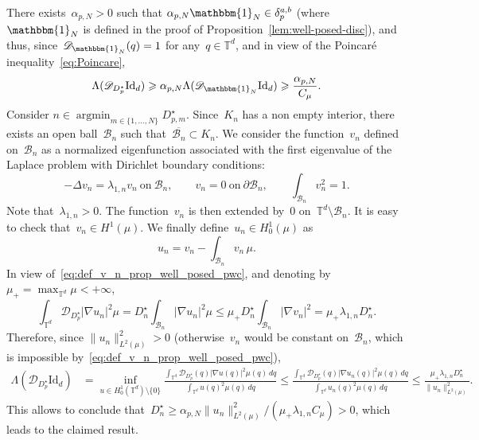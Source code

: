 \documentclass{article}
\newcommand{\dps}{\displaystyle }
\newcommand{\Id}{\mathrm{Id}}
\renewcommand{\leq}{\leqslant}
\renewcommand{\geq}{\geqslant}
\def\T{\mathbb{T}}
\newcommand{\Df}{\mathscr{D}}
\newcommand{\diff}{D}
\newcommand{\diffset}{\delta}
\renewcommand{\dim}{d}
\begin{document}
There exists~$\alpha_{p,N} > 0$ such that $\alpha_{p,N} \mathbbm{1}_N\in\diffset_p^{a,b}$ (where~$\mathbbm{1}_N$ is defined in the proof of Proposition~\ref{lem:well-posed-disc}), and thus, since~$\Df_{\mathbbm{1}_N}(q) = 1$ for any~$q \in \T^\dim$, and in view of the Poincar\'e inequality~\eqref{eq:Poincare},
\begin{equation}
  \label{eq:lower-lambda}
  \Lambda(\Df_{\diff^{\star}_p} \Id_\dim) \geq \alpha_{p,N}\Lambda(\Df_{\mathbbm{1}_N} \Id_\dim) \geq \frac{\alpha_{p,N}}{C_{\mu}}.
\end{equation}
Consider $n \in \operatorname{argmin}_{m \in \{1,\ldots,N\}} \diff^{\star}_{p,m}$.
Since~$K_n$ has a non empty interior, there exists an open ball~$\mathscr{B}_n$ such that~$\overline{\mathscr{B}_n} \subset K_n$. We consider the function~$v_n$ defined on~$\mathscr{B}_n$ as a normalized eigenfunction associated with the first eigenvalue of the Laplace problem with Dirichlet boundary conditions:
\begin{equation}
  \label{eq:def_v_n_prop_well_posed_pwc}
  -\Delta v_n = \lambda_{1,n} v_n \ \mathrm{on} \ \mathscr{B}_n, \qquad v_n = 0 \ \mathrm{on} \ \partial \mathscr{B}_n, \qquad \int_{\mathscr{B}_n} v_n^2 = 1. 
\end{equation}
Note that~$\lambda_{1,n} > 0$. The function~$v_n$ is then extended by~0 on~$\T^\dim \setminus \mathscr{B}_n$. It is easy to check that~$v_n \in H^1(\mu)$. We finally define~$u_n \in H^1_0(\mu)$ as
\[
u_n = v_n - \int_{\mathscr{B}_n} v_n \, \mu.
\]
In view of~\eqref{eq:def_v_n_prop_well_posed_pwc}, and denoting by~$\mu_+ = \max_{\T^\dim} \mu < +\infty$,
\[
\int_{\T^\dim} \Df_{\diff^{\star}_p} |\nabla u_n|^2 \mu = \diff^\star_n \int_{\mathscr{B}_n} |\nabla u_n|^2 \mu \leq \mu_+ \diff^\star_n \int_{\mathscr{B}_n} |\nabla v_n|^2 = \mu_+ \lambda_{1,n} \diff^\star_n.
\]
Therefore, since $\|u_n\|^2_{L^2(\mu)} > 0$ (otherwise~$v_n$ would be constant on~$\mathscr{B}_n$, which is impossible by~\eqref{eq:def_v_n_prop_well_posed_pwc}),
\begin{equation}
  \begin{aligned}
    \Lambda(\Df_{\diff^{\star}_p}\Id_\dim) &= \inf_{u\in H^1_0(\T^\dim) \setminus\{0\}}\frac{\dps \int_{\T^\dim}\Df_{\diff^{\star}_p}(q)|\nabla u(q)|^2\mu(q)\,dq}{\dps\int_{\T^\dim}u(q)^2\mu(q)\,dq} \leq \frac{\dps \int_{\T^\dim}\Df_{\diff^{\star}_p}(q)|\nabla u_n(q)|^2\mu(q)\,dq}{\dps\int_{\T^\dim}u_n(q)^2\mu(q)\,dq} \leq \frac{\mu_+\lambda_{1,n} \diff^\star_n }{\|u_n\|^2_{L^2(\mu)}} .
  \end{aligned}
\end{equation}
This allows to conclude that~$\diff^{\star}_n\geq \alpha_{p,N}\|u_n\|^2_{L^2(\mu)} / (\mu_+ \lambda_{1,n}C_{\mu}) > 0$, which leads to the claimed result. 
\end{document}
